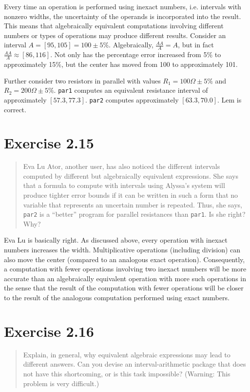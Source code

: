 \documentclass{article}
\begin{document}
Every time an operation is performed using inexact numbers, i.e. intervals with
nonzero widths, the uncertainty of the operands is incorporated into the result.
This means that algebraically equivalent computations involving different numbers
or types of operations may produce different results. Consider an interval
$A = [95,105] = 100\pm5\%$. Algebraically, $\frac{AA}{A} = A$, but in fact
$\frac{AA}{A} \approx [86,116]$. Not only has the percentage error increased from
5\% to approximately 15\%, but the center has moved from 100 to approximately
101.

Further consider two resistors in parallel with values $R_1=100\Omega\pm5\%$ and
$R_2=200\Omega\pm5\%$. \texttt{par1} computes an equivalent resistance interval
of approximately $[57.3,77.3]$. \texttt{par2} computes approximately
$[63.3,70.0]$. Lem is correct.

\section{Exercise 2.15}
\begin{quote}
    Eva Lu Ator, another user, has also noticed the different intervals
    computed by different but algebraically equivalent expressions. She says
    that a formula to compute with intervals using Alyssa’s system will produce
    tighter error bounds if it can be written in such a form that no variable
    that represents an uncertain number is repeated. Thus, she says,
    \texttt{par2} is a “better” program for parallel resistances than
    \texttt{par1}. Is she right? Why?
\end{quote}

Eva Lu is basically right. As discussed above, every operation with inexact
numbers increases the width. Multiplicative operations (including division) can
also move the center (compared to an analogous exact operation). Consequently,
a computation with fewer operations involving two inexact numbers will be more
accurate than an algebraically equivalent operation with more such operations
in the sense that the result of the computation with fewer operations will be
closer to the result of the analogous computation performed using exact
numbers.

\section{Exercise 2.16}
\begin{quote}
    Explain, in general, why equivalent algebraic expressions may lead to
    different answers. Can you devise an interval-arithmetic package that does
    not have this shortcoming, or is this task impossible? (Warning: This
    problem is very difficult.)
\end{quote}
\end{document}
